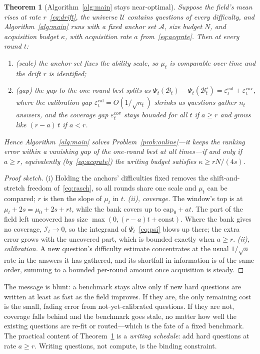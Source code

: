 \documentclass[11pt]{article}
\newcommand{\cB}{\mathcal{B}}
\newcommand{\cU}{\mathcal{U}}
\newcommand{\cA}{\mathcal{A}}
\newcommand{\cI}{\mathcal{I}}
\theoremstyle{plain}
\newtheorem{theorem}{Theorem}
\theoremstyle{definition}
\theoremstyle{remark}
\begin{document}
\begin{theorem}[Algorithm~\ref{alg:main} stays near-optimal]
\label{thm:main}
Suppose the field's mean rises at rate $r$~\eqref{eq:drift}, the universe $\cU$
contains questions of every difficulty, and Algorithm~\ref{alg:main} runs with a
fixed anchor set $\cA$, size budget $N$, and acquisition budget $\kappa$, with
acquisition rate $a$ from~\eqref{eq:acqrate}. Then at every round $t$:
\begin{enumerate}
\item[(i)] (scale) the anchor set fixes the ability scale, so $\mu_t$ is comparable
over time and the drift $r$ is identified;
\item[(ii)] (gap) the gap to the one-round best splits as
$\Psi_t(\cB_t)-\Psi_t(\cB^\star_t)=\varepsilon^{\mathrm{cal}}_t+\varepsilon^{\mathrm{cov}}_t$,
where the \textup{calibration gap}
$\varepsilon^{\mathrm{cal}}_t=O(1/\sqrt{n_t})$ shrinks as questions gather $n_t$
answers, and the \textup{coverage gap} $\varepsilon^{\mathrm{cov}}_t$ stays bounded
for all $t$ if $a\ge r$ and grows like $(r-a)\,t$ if $a<r$.
\end{enumerate}
Hence Algorithm~\ref{alg:main} solves Problem~\ref{prob:online}---it keeps the
ranking error within a vanishing gap of the one-round best at all times---\textup{if
and only if} $a\ge r$, equivalently (by~\eqref{eq:acqrate}) the writing budget
satisfies $\kappa\ge rN/(4s)$.
\end{theorem}

\begin{proof}[Proof sketch]
(i) Holding the anchors' difficulties fixed removes the shift-and-stretch freedom
of~\eqref{eq:rasch}, so all rounds share one scale and $\mu_t$ can be compared; $r$
is then the slope of $\mu_t$ in $t$. \emph{(ii), coverage.} The window's top is at
$\mu_t+2s=\mu_0+2s+rt$, while the bank covers up to $\mathrm{cap}_0+at$. The part of
the field left uncovered has size $\max(0,(r-a)t+\mathrm{const})$. Where the bank
gives no coverage, $\cI_t\to 0$, so the integrand of $\Psi_t$~\eqref{eq:psi} blows up
there; the extra error grows with the uncovered part, which is bounded exactly when
$a\ge r$. \emph{(ii), calibration.} A new question's difficulty estimate concentrates
at the usual $1/\sqrt n$ rate in the answers it has gathered, and its shortfall in
information is of the same order, summing to a bounded per-round amount once
acquisition is steady.
\end{proof}

The message is blunt: a benchmark stays alive only if new hard questions are written
at least as fast as the field improves. If they are, the only remaining cost is the
small, fading error from not-yet-calibrated questions. If they are not, coverage
falls behind and the benchmark goes stale, no matter how well the existing questions
are re-fit or routed---which is the fate of a fixed benchmark. The practical content
of Theorem~\ref{thm:main} is a \emph{writing schedule}: add hard questions at rate
$a\ge r$. Writing questions, not compute, is the binding constraint.
\end{document}
